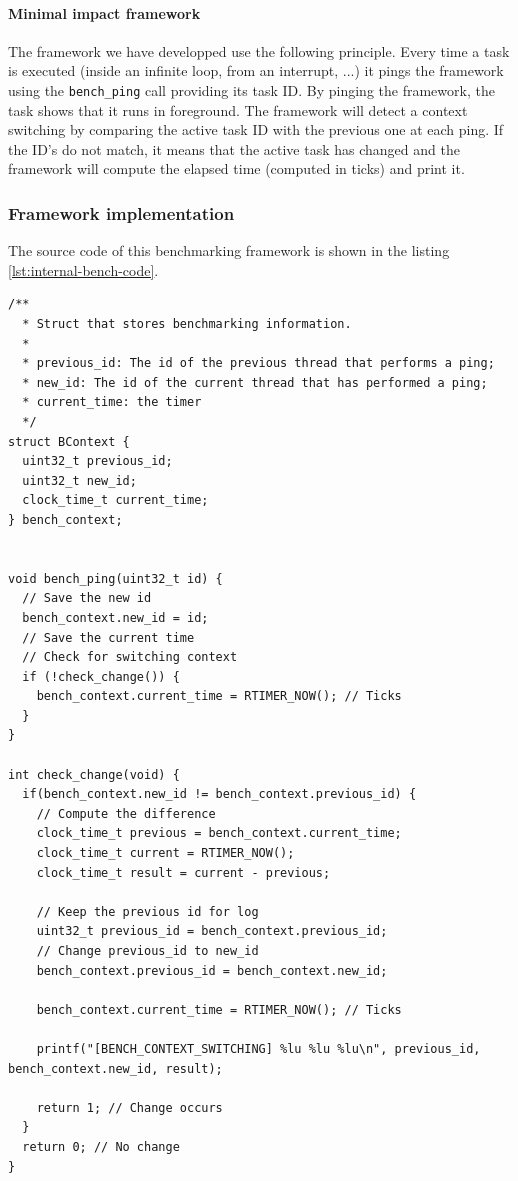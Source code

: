 \paragraph{Minimal impact framework}
The framework we have developped use the following principle.
Every time a task is executed (inside an infinite loop, from an interrupt, ...) it pings the framework using the \texttt{bench\_ping} call providing its task ID.
By pinging the framework, the task shows that it runs in foreground.
The framework will detect a context switching by comparing the active task ID with the previous one at each ping.
If the ID's do not match, it means that the active task has changed and the framework will compute the elapsed time (computed in ticks) and print it.

\subsubsection{Framework implementation}

The source code of this benchmarking framework is shown in the listing \ref{lst:internal-bench-code}.

\begin{lstlisting}[style=CStyle, label={lst:internal-bench-code}, caption={Source code of the benchmarking framework implemented in Contiki}]
/**
  * Struct that stores benchmarking information.
  * 
  * previous_id: The id of the previous thread that performs a ping;
  * new_id: The id of the current thread that has performed a ping;
  * current_time: the timer
  */
struct BContext {
  uint32_t previous_id;
  uint32_t new_id;
  clock_time_t current_time;
} bench_context;


void bench_ping(uint32_t id) {
  // Save the new id
  bench_context.new_id = id;
  // Save the current time
  // Check for switching context
  if (!check_change()) {
    bench_context.current_time = RTIMER_NOW(); // Ticks
  }
}

int check_change(void) {
  if(bench_context.new_id != bench_context.previous_id) {
    // Compute the difference
    clock_time_t previous = bench_context.current_time;
    clock_time_t current = RTIMER_NOW();
    clock_time_t result = current - previous;

    // Keep the previous id for log
    uint32_t previous_id = bench_context.previous_id;
    // Change previous_id to new_id
    bench_context.previous_id = bench_context.new_id;

    bench_context.current_time = RTIMER_NOW(); // Ticks

    printf("[BENCH_CONTEXT_SWITCHING] %lu %lu %lu\n", previous_id, bench_context.new_id, result);
    
    return 1; // Change occurs
  }
  return 0; // No change
}
\end{lstlisting}


